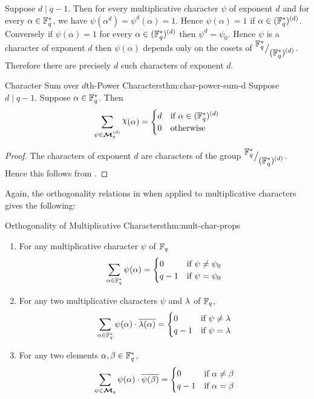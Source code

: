 Suppose $d\mid q-1$. Then for every multiplicative character $\psi$ of exponent $d$ and for every $\alpha\in \mathbb{F}_q^*$, we have $\psi(\alpha^d)=\psi^d(\alpha)=1$. Hence $\psi(\alpha)=1$ if $\alpha\in (\mathbb{F}_q^*)^{(d)}$. Conversely if $\psi(\alpha)=1$ for every $\alpha\in (\mathbb{F}_q^*)^{(d)}$ then $\psi^d=\psi_0$. Hence $\psi$ is a character of exponent $d$ then $\psi(\alpha)$ depends only on the cosets of ${^{\textstyle \mathbb{F}_q^*}\big/_{\textstyle (\mathbb{F}_q^*)^{(d)}}}$. Therefore there are precisely $d$ such characters of exponent $d$.

\begin{Theorem}{Character Sum over $d$th-Power Characters}{thm:char-power-sum-d}
  Suppose $d\mid q-1$. Suppose $\alpha\in\mathbb{F}_q^*$. Then $$\sum_{\psi\in\Mq^{(d)}}\chi(\alpha)=\begin{cases}
      d & \text{if }\alpha\in (\bbF_q^*)^{(d)} \\
      0 & \text{otherwise}
    \end{cases}$$
\end{Theorem}
\begin{proof}
  The characters of exponent $d$ are characters of the group ${^{\textstyle \mathbb{F}_q^*}\big/_{\textstyle (\mathbb{F}_q^*)^{(d)}}}$. Hence this follows from .
\end{proof}

Again, the orthogonality relations in  when applied to multiplicative characters gives the following:
\begin{Theorem}{Orthogonality of Multiplicative Characters}{thm:mult-char-props}
  \begin{enumerate}[label=(\roman*)]
    \item For any multiplicative character $\psi$ of $\mathbb{F}_q$ $$\sum_{\alpha\in\mathbb{F}^*_q}\psi(\alpha)=\begin{cases}
              0   & \text{if $\psi\neq \psi_0$} \\
              q-1 & \text{if $\psi= \psi_0$}
            \end{cases}$$
    \item For any two multiplicative characters $\psi$ and $\lambda$ of $\mathbb{F}_q$, $$\sum_{\alpha\in\mathbb{F}^*_q}\psi(\alpha)\cdot \overline{\lambda(\alpha)}=\begin{cases}
              0   & \text{if $\psi\neq \lambda$} \\
              q-1 & \text{if $\psi= \lambda$}
            \end{cases}$$
    \item For any two elements $\alpha,\beta\in\mathbb{F}^*_q$, $$\sum_{\psi\in \boldsymbol{\mathcal{M}}_q}\psi(\alpha)\cdot\overline{\psi(\beta)}=\begin{cases}
              0   & \text{if $\alpha\neq \beta$} \\
              q-1 & \text{if $\alpha=\beta$}
            \end{cases}$$
  \end{enumerate}
\end{Theorem}



